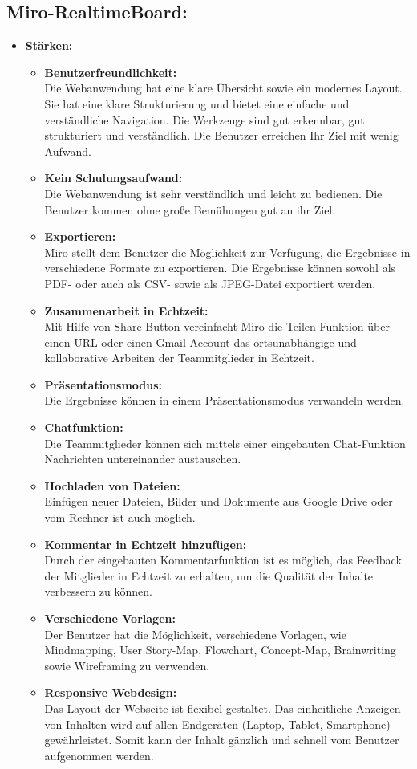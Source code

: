 \subsection{Miro-RealtimeBoard:}
\label{sec:stärken und schwächen von miro}
\begin{itemize}
\item \textbf{Stärken:}
\begin{itemize}
\item \textbf{Benutzerfreundlichkeit:}\\
Die Webanwendung hat eine klare Übersicht sowie ein modernes Layout. Sie hat eine klare Strukturierung und bietet eine einfache und verständliche Navigation. Die Werkzeuge sind gut erkennbar, gut strukturiert und verständlich. Die Benutzer erreichen Ihr Ziel mit wenig Aufwand.
\item \textbf{Kein Schulungsaufwand:}\\
Die Webanwendung ist sehr verständlich und leicht zu bedienen. Die Benutzer kommen ohne große Bemühungen gut an ihr Ziel.
\item \textbf{Exportieren:}\\
Miro stellt dem Benutzer die Möglichkeit zur Verfügung, die Ergebnisse in verschiedene Formate zu exportieren. Die Ergebnisse können sowohl als PDF- oder auch als CSV- sowie als JPEG-Datei exportiert werden.
\item \textbf{Zusammenarbeit in Echtzeit:}\\
Mit Hilfe von Share-Button vereinfacht Miro die Teilen-Funktion über einen URL oder einen Gmail-Account das ortsunabhängige und kollaborative Arbeiten der Teammitglieder in Echtzeit.
\item \textbf{Präsentationsmodus:}\\
Die Ergebnisse können in einem Präsentationsmodus verwandeln werden.
\item \textbf{Chatfunktion:}\\
Die Teammitglieder können sich mittels einer eingebauten Chat-Funktion Nachrichten untereinander austauschen.
\item \textbf{Hochladen von Dateien:}\\
Einfügen neuer Dateien, Bilder und Dokumente aus Google Drive oder vom Rechner ist auch möglich.
\item \textbf{Kommentar in Echtzeit hinzufügen:}\\
Durch der eingebauten Kommentarfunktion ist es möglich, das Feedback der Mitglieder in Echtzeit zu erhalten, um die Qualität der Inhalte verbessern zu können. 
\item \textbf{Verschiedene Vorlagen:}\\
Der Benutzer hat die Möglichkeit, verschiedene Vorlagen, wie Mindmapping, User Story-Map, Flowchart, Concept-Map, Brainwriting sowie Wireframing zu verwenden.
\item \textbf{Responsive Webdesign:}\\
Das Layout der Webseite ist flexibel gestaltet. Das einheitliche Anzeigen von Inhalten wird auf allen Endgeräten (Laptop, Tablet, Smartphone) gewährleistet. Somit kann der Inhalt gänzlich und schnell vom Benutzer aufgenommen werden.
\end{itemize}
\end{itemize}

